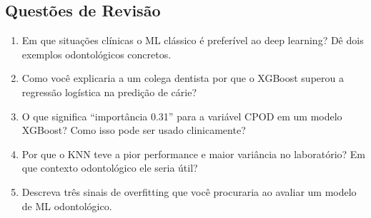 \subsection{Questões de Revisão}
\begin{enumerate}
    \item Em que situações clínicas o ML clássico é preferível ao deep learning? Dê dois exemplos odontológicos concretos.
    \item Como você explicaria a um colega dentista por que o XGBoost superou a regressão logística na predição de cárie?
    \item O que significa ``importância 0.31'' para a variável CPOD em um modelo XGBoost? Como isso pode ser usado clinicamente?
    \item Por que o KNN teve a pior performance e maior variância no laboratório? Em que contexto odontológico ele seria útil?
    \item Descreva três sinais de overfitting que você procuraria ao avaliar um modelo de ML odontológico.
\end{enumerate}


